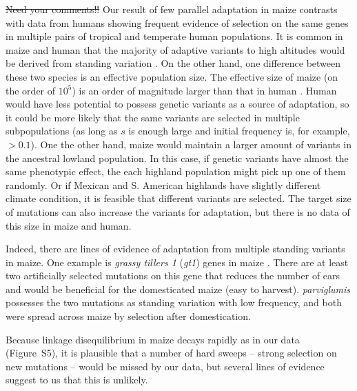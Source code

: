 {{\st{Need your comments!!}
Our result of few parallel adaptation in maize contrasts with data from humans \citep{Tennessen_2011_21698142} showing frequent evidence of selection on the same genes in multiple pairs of tropical and temperate human populations.  
It is common in maize and human that the majority of adaptive variants to high altitudes would be derived from standing variation \cite[]{Tennessen_2011_21698142}.
On the other hand, one difference between these two species is an effective population size.
The effective size of maize (on the order of $10^5$) is an order of magnitude larger than that in human \cite[]{Takahata_1997_9114074}.
Human would have less potential to possess genetic variants as a source of adaptation, so it could be more likely that the same variants are selected in multiple subpopulations (as long as $s$ is enough large and initial frequency is, for example, $>0.1$).
One the other hand, maize would maintain a larger amount of variants in the ancestral lowland population.
In this case, if genetic variants have almost the same phenotypic effect, the each highland population might pick up one of them randomly.
Or if Mexican and S. American highlands have slightly different climate condition, it is feasible that different variants are selected.
The target size of mutations can also increase the variants for adaptation, but there is no data of this size in maize and human.

Indeed, there are lines of evidence of adaptation from multiple standing variants in maize. %
One example is \emph{grassy tillers 1} (\emph{gt1}) genes in maize \cite[]{Wills_2013_23825971}.
There are at least two artificially selected mutations on this gene that reduces the number of ears and would be beneficial for the domesticated maize (easy to harvest).
\emph{parviglumis} possesses the two mutations as standing variation with low frequency, and both were spread across maize by selection after domestication.

Because linkage disequilibrium in maize decays rapidly \cite[]{Remington_2001_11562485,Tenaillon_2001_11470895} as in our data (Figure~S5), it is plausible that a number of hard sweeps -- strong selection on new mutations -- would be missed by our data, but several lines of evidence suggest to us that this is unlikely.  


}}
